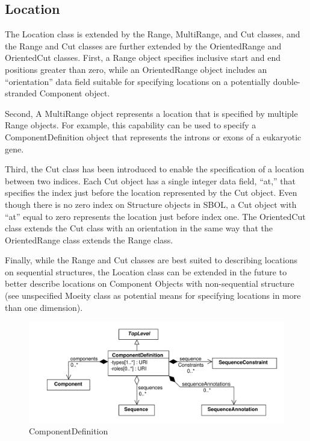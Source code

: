 \documentclass[draftspec]{sbmlpkgspec}
\begin{document}
\subsection{Location}

The Location class is extended by the Range, MultiRange, and Cut classes, and the Range and Cut classes are further extended by the OrientedRange and OrientedCut classes. First, a Range object specifies inclusive start and end positions greater than zero, while an OrientedRange object includes an “orientation” data field suitable for specifying locations on a potentially double-stranded Component object.

Second, A MultiRange object represents a location that is specified by multiple Range objects. For example, this capability can be used to specify a ComponentDefinition object that represents the introns or exons of a eukaryotic gene.

Third, the Cut class has been introduced to enable the specification of a location between two indices. Each Cut object has a single integer data field, “at,” that specifies the index just before the location represented by the Cut object. Even though there is no zero index on Structure objects in SBOL, a Cut object with “at” equal to zero represents the location just before index one. The OrientedCut class extends the Cut class with an orientation in the same way that the OrientedRange class extends the Range class.

Finally, while the Range and Cut classes are best suited to describing locations on sequential structures, the Location class can be extended in the future to better describe locations on Component Objects with non-sequential structure (see unspecified Moeity class as potential means for specifying locations in more than one dimension).

\begin{figure}[h]
\begin{center}
\includegraphics[width=\textwidth]{uml/component_definition}
\caption[]{ComponentDefinition}
\label{uml:component_definition}
\end{center}
\end{figure}
\end{document}
